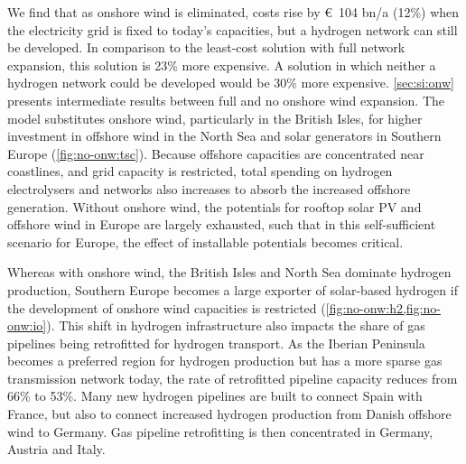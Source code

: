 We find that as onshore wind is eliminated, costs rise by \euro~104 bn/a (12\%)
when the electricity grid is fixed to today's capacities, but a hydrogen network
can still be developed. In comparison to the least-cost solution with full
network expansion, this solution is 23\% more expensive. A solution in which
neither a hydrogen network could be developed would be 30\% more expensive.
\cref{sec:si:onw} presents intermediate results between full and no onshore wind
expansion. The model substitutes onshore wind, particularly in the British
Isles, for higher investment in offshore wind in the North Sea and solar
generators in Southern Europe (\cref{fig:no-onw:tsc}). Because offshore
capacities are concentrated near coastlines, and grid capacity is restricted,
total spending on hydrogen electrolysers and networks also increases to absorb
the increased offshore generation. Without onshore wind, the potentials for
rooftop solar PV and offshore wind in Europe are largely exhausted, such that in
this self-sufficient scenario for Europe, the effect of installable potentials
becomes critical.


Whereas with onshore wind, the British Isles and North Sea dominate hydrogen
production, Southern Europe becomes a large exporter of solar-based hydrogen if
the development of onshore wind capacities is restricted
(\cref{fig:no-onw:h2,fig:no-onw:io}). This shift in hydrogen infrastructure also
impacts the share of gas pipelines being retrofitted for hydrogen transport. As
the Iberian Peninsula becomes a preferred region for hydrogen production but has
a more sparse gas transmission network today, the rate of retrofitted pipeline
capacity reduces from 66\% to 53\%. Many new hydrogen pipelines are built to
connect Spain with France, but also to connect increased hydrogen production
from Danish offshore wind to Germany. Gas pipeline retrofitting is then
concentrated in Germany, Austria and Italy.
